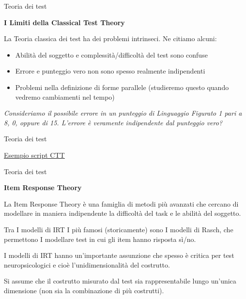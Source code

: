 \documentclass[
  ignorenonframetext,
]{beamer}
\begin{document}
\begin{frame}{Teoria dei test}
\label{teoria-dei-test-2}
\begin{center}
  \textbf{I Limiti della Classical Test Theory}
\end{center}

La Teoria classica dei test ha dei problemi intrinseci. Ne citiamo
alcuni: \pause

\begin{itemize}
\item
  Abilità del soggetto e complessità/difficoltà del test sono confuse
\item
  Errore e punteggio vero non sono spesso realmente indipendenti
\item
  Problemi nella definizione di forme parallele (studieremo questo
  quando vedremo cambiamenti nel tempo)
\end{itemize}

\pause

\emph{Consideriamo il possibile errore in un punteggio di Linguaggio
Figurato 1 pari a 8, 0, oppure di 15. L'errore è veramente indipendente
dal punteggio vero?}
\end{frame}

\begin{frame}{Teoria dei test}
\label{teoria-dei-test-3}
\begin{center}
  \href{https://github.com/giorgioarcara/stat_forensic_neuropsy/blob/main/code/02_True_score.R}{\underline{Esempio script CTT}}
\end{center}
\end{frame}

\begin{frame}{Teoria dei test}
\label{teoria-dei-test-4}
\begin{center}
  \textbf{Item Response Theory}
\end{center}

La Item Response Theory è una famiglia di metodi più avanzati che
cercano di modellare in maniera indipendente la difficoltà del task e le
abilità del soggetto.

Tra I modelli di IRT I più famosi (storicamente) sono I modelli di
Rasch, che permettono I modellare test in cui gli item hanno risposta
sì/no. \pause

I modelli di IRT hanno un'importante assunzione che spesso è critica per
test neuropsicologici e cioè l'unidimensionalità del costrutto. \pause

Si assume che il costrutto misurato dal test sia rappresentabile lungo
un'unica dimensione (non sia la combinazione di più costrutti).
\end{frame}
\end{document}

